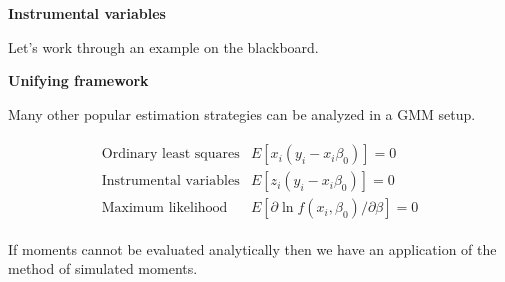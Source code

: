 \begin{frame}\textbf{Instrumental variables}\vspace{1cm}

\begin{center}
Let's work through an example on the blackboard.
\end{center}

\end{frame}
\begin{frame}\textbf{Unifying framework}\vspace{1cm}

Many other popular estimation strategies can be analyzed in a GMM setup.

\begin{align*}\begin{array}{ll}
\text{Ordinary least squares} & E[x_i (y_i - x_i \beta_0)] = 0 \\
\text{Instrumental variables} & E[z_i (y_i - x_i \beta_0)] = 0 \\
\text{Maximum likelihood}     & E[\partial \ln f(x_i, \beta_0) / \partial\beta] = 0
\end{array}
\end{align*}

\end{frame}
\begin{frame}

If moments cannot be evaluated analytically then we have an application of the method of simulated moments.
\end{frame}

